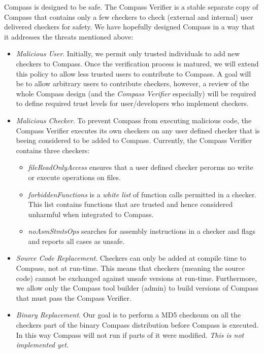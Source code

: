 Compass is designed to be safe. The Compass Verifier is a stable separate copy of Compass
that contains only a few checkers to check (external and internal) user delivered checkers
for safety. We have hopefully designed Compass in a way that it addresses the threats
mentioned above:
\begin{itemize}
\item \emph{Malicious User}. Initially, we permit only trusted individuals to add new
    checkers to Compass. Once the verification process is matured, we will extend this
    policy to allow less trusted users to contribute to Compass. A goal will be to allow
    arbitrary users to contribute checkers, however, a review of the whole Compass design
    (and the {\em Compass Verifier} especially) will be required to define required trust
    levels for user/developers who implement checkers.

\item \emph{Malicious Checker}. To prevent Compass from executing malicious code, the Compass
    Verifier executes its own checkers on any user defined checker that is beeing
    considered to be added to Compass. Currently, the Compass Verifier contains three checkers:
   \begin{itemize}
      \item \emph{fileReadOnlyAccess} ensures that a user defined checker perorms no write
         or execute operations on files. 
      \item \emph{forbiddenFunctions} is a {\em white list} of function calls permitted in a
         checker. This list contains functions that are trusted and hence considered
         unharmful when integrated to Compass.
      \item \emph{noAsmStmtsOps} searches for assembly instructions in a checker and flags
         and reports all cases as unsafe.
\end{itemize}

\item \emph{Source Code Replacement}. Checkers can only be added at compile time to
    Compass, not at run-time. This means that checkers (meaning the source code) cannot be
    exchanged against unsafe versions at run-time. Furthermore, we allow only the Compass
    tool builder (admin) to build versions of Compass that must pass the Compass Verifier.

\item \emph{Binary Replacement}. Our goal is to perform a MD5 checksum on all the checkers
    part of the binary Compass distribution before Compass is executed. In this way
    Compass will not run if parts of it were modified. {\em This is not implemented yet.}

\end{itemize} 



